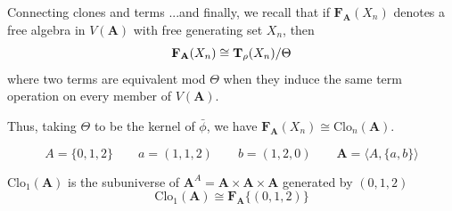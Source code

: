 \documentclass[xcolor=dvipsnames,9pt,hide notes,mathserif]{beamer}
\newcommand{\bA}{\ensuremath{\mathbf{A}}}
\newcommand{\bF}{\ensuremath{\mathbf{F}}}
\theoremstyle{definition}
\theoremstyle{remark}
\numberwithin{theorem}{section}
\numberwithin{claim}{section}
\numberwithin{equation}{section}
\numberwithin{conjecture}{section}
\newcommand{\<}{\ensuremath{\langle}}
\renewcommand{\>}{\ensuremath{\rangle}}
\newcommand{\Clo}{\ensuremath{\mathrm{Clo}}}
\begin{document}
\begin{frame}[label=ClonesAndTerms]{Connecting clones and terms}
...and finally, we recall that if 
$\bF_\bA(X_n)$ denotes a free algebra in $V(\bA)$ with free generating set $X_n$, then
\[
\bF_\bA(X_n) \cong \bTXn / \Theta
\]
where two terms are equivalent mod $\Theta$ when they induce the same term
operation on every member of $V(\bA)$.  

\vskip2mm

Thus, taking $\Theta$ to be the kernel of $\bar{\phi}$, we have
$\bF_\bA(X_n) \cong \Clo_n(\bA)$.
\end{frame}

\begin{frame}
  
  \begin{example}
\[
A = \{0, 1, 2\} \qquad a = (1, 1, 2) \qquad b = (1,2,0)
\qquad \bA = \<A, \{a,b\}\>
\]

 \vskip2mm
\hskip1cm $\Clo_1(\bA)$ is the subuniverse of $\bA^A = \bA \times \bA \times \bA$
generated by $(0,1,2)$
 \vskip2mm
\[
\Clo_1(\bA)\cong \bF_\bA\{(0,1,2)\}
\]

~
\end{example}

\end{frame}

\begin{frame}[shrink=16,label=FreeAlgebraExample]{}
\begin{figure}[h!]
  \centering
{
  \begin{tikzpicture}[->,>=stealth',shorten >=1pt,auto,node distance=2cm,
thick, main node/.style={circle,fill=blue!20,draw,font=\sffamily\small},scale=.3]

\end{tikzpicture}
}
\end{figure}
\end{frame}
\end{document}
